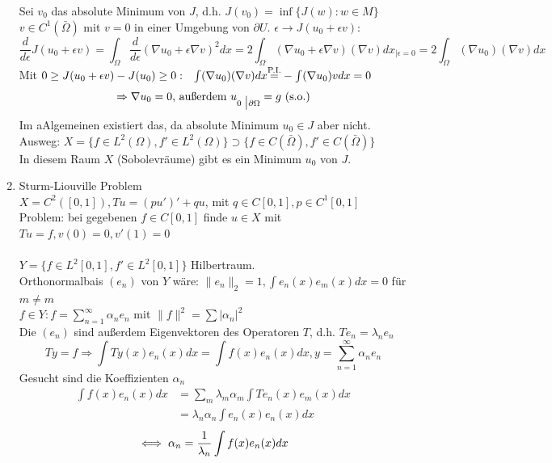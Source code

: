 \begin{enumerate}
	Sei $v_{0}$ das absolute Minimum von $J$, d.h. $J(v_{0}) = \inf \{ J(w): w \in M \}$ \\
	$v \in C^{1}(\bar \Omega)$ mit $v = 0$ in einer Umgebung von $\partial U$. $\epsilon \rightarrow J(u_{0} + \epsilon v)$:
	\[ \frac{d}{d\epsilon} J(u_{0} + \epsilon v) = \int_{\Omega} \frac{d}{d\epsilon} (\nabla u_{0} + \epsilon \nabla v)^{2} dx = 2 \int_{\Omega} (\nabla u_{0} + \epsilon \nabla v)(\nabla v) dx_{\big| \epsilon = 0} = 2 \int_\Omega (\nabla u_{0}) (\nabla v) dx \]
	Mit $0 \geq J(u_{0} + \epsilon v)- J(u_{0}) \geq 0: \hspace{0.25cm} \int (\nabla u_{0})(\nabla v) dx \overset{\text{P.I.}}{{=}} - \int (\nabla u_{0})v dx = 0$ \\
	\[ \Rightarrow \nabla u_{0} = 0 \text{, au{\ss}erdem } u_{0 \hspace{0.1cm} \big| \partial \Omega} = g \text{ (s.o.)} \]
	Im aAlgemeinen existiert das, da absolute Minimum $u_{0} \in J$ aber nicht. \\
	Ausweg: $X = \{ f \in L^{2}(\Omega), f' \in L^{2}(\Omega) \} \supset \{f \in C(\bar \Omega), f' \in C(\bar \Omega) \} $	\\
	In diesem Raum $X$ (Sobolevräume) gibt es ein Minimum $u_{0}$ von $J$. \\
	\item Sturm-Liouville Problem  \\
	$X = C^{2}([0, 1]), Tu = (pu')' + qu$, mit $q \in C[0, 1], p \in C^{1}[0, 1]$ \\ 
	Problem: bei gegebenen $f \in C[0, 1]$ finde $u \in X$ mit $Tu = f, v(0) = 0, v'(1) = 0$ \\ \\
	$Y = \{ f \in L^{2}[0, 1], f' \in L^{2}[0, 1] \}$ Hilbertraum. \\
	Orthonormalbais $(e_{n})$ von $Y$ wäre: $\| e_{n} \|_{2} = 1, \int e_{n}(x) e_{m}(x) dx = 0$ für $m \neq m$ \\
	$f \in Y: f = \sum_{n = 1}^{\infty} \alpha_{n} e_{n}$ mit $\| f \|^2 = \sum | \alpha_{n} |^2$ \\
	Die $(e_{n})$ sind au{\ss}erdem Eigenvektoren des Operatoren $T$, d.h. $Te_{n} = \lambda_{n} e_{n}$ \\
	\[ Ty = f \Rightarrow \int Ty(x) e_{n}(x) dx = \int f(x) e_{n}(x) dx, y = \sum_{n = 1}^{\infty} \alpha_{n} e_{n} \]
	Gesucht sind die Koeffizienten $\alpha_{n}$
	\begin{align*}
		\int f(x) e_{n}(x) dx & = \sum_{m} \lambda_{m} \alpha_{m} \int T e_{n}(x) e_{m}(x) dx \\
							  & =  \lambda_{n} \alpha_{n} \int e_{n}(x) e_{n}(x) dx
	\end{align*}
	\[ \iff \alpha_{n} = \frac{1}{\lambda_n} \int f(x) e_{n}(x) dx \]
\end{enumerate}

\newpage